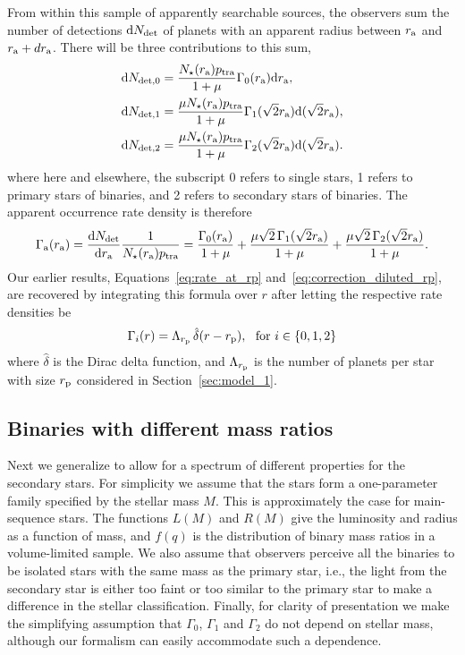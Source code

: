 \documentclass[12pt,modern,trackchanges]{aastex61}
\renewcommand{\a}{_{\rm a}}
\newcommand{\p}{_{\rm p}}
\begin{document}
From within this sample of apparently searchable sources, the
observers sum the number of detections ${\rm d}N_{\rm det}$ of planets
with an apparent radius between $r\a$ and $r\a + dr\a$.  There will be
three contributions to this sum,
\begin{align}
  {\rm d}N_{{\rm det},0} &= 
      \frac{N_\star(r\a) p_{\rm tra}}{1+\mu}
      \Gamma_0(r\a)\mathrm{d}r\a,
  \label{eq:n0} \\
  {\rm d}N_{{\rm det},1} &= 
      \frac{\mu N_\star(r\a) p_{\rm tra}}{1+\mu} 
      \Gamma_1(\sqrt{2}r\a)\mathrm{d}(\sqrt{2}r\a),
	\label{eq:n1} \\
  {\rm d}N_{{\rm det},2} &=
      \frac{\mu N_\star(r\a) p_{\rm tra}}{1+\mu} 
      \Gamma_2(\sqrt{2}r\a)\mathrm{d}(\sqrt{2}r\a).
	\label{eq:n2}
\end{align}
where here and elsewhere, the subscript 0 refers to single stars, 1
refers to primary stars of binaries, and 2 refers to secondary stars
of binaries. The apparent occurrence rate density is therefore
\begin{equation}
  \Gamma\a(r\a) = \frac{{\rm d}N_{\rm det}}{{\rm d}r\a} \frac{1}{N_\star(r\a) p_{\rm tra}} =
  \frac{\Gamma_0(r\a)}{1+\mu} +
  \frac{\mu\sqrt{2}\,\Gamma_1(\sqrt{2}r\a)}{1+\mu} +
  \frac{\mu\sqrt{2}\,\Gamma_2(\sqrt{2}r\a)}{1+\mu}.
	\label{eq:formula_twin_binary}
\end{equation}
Our earlier results, Equations~\ref{eq:rate_at_rp}
and~\ref{eq:correction_diluted_rp}, are recovered by integrating this
formula over $r$ after letting the respective rate densities be
\begin{equation}
  \Gamma_i(r) = \Lambda_{r\p}\, \hat{\delta}(r-r\p),~~{\rm for}\ i\in\{0,1,2\}
\end{equation}
where $\hat{\delta}$ is the Dirac delta function, and $\Lambda_{r\p}$
is the number of planets per star with size $r\p$ considered in
Section~\ref{sec:model_1}.

\subsection{Binaries with different mass ratios}
\label{sec:general_formula}

Next we generalize to allow for a spectrum of different properties for
the secondary stars.  For simplicity we assume that the stars form a
one-parameter family specified by the stellar mass $M$.  This is
approximately the case for main-sequence stars.  The functions $L(M)$
and $R(M)$ give the luminosity and radius as a function of mass, and
$f(q)$ is the distribution of binary mass ratios in a volume-limited
sample.  We also assume that observers perceive all the binaries to be
isolated stars with the same mass as the primary star, i.e., the light
from the secondary star is either too faint or too similar to the
primary star to make a difference in the stellar classification.
Finally, for clarity of presentation we make the simplifying
assumption that $\Gamma_0$, $\Gamma_1$ and $\Gamma_2$ do not depend on
stellar mass, although our formalism can easily accommodate such a
dependence.
\end{document}
